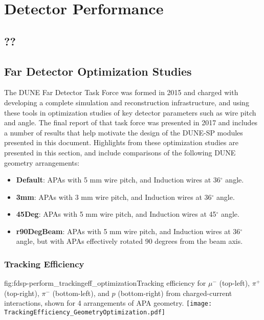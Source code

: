 \chapter{Detector Performance}
\label{ch:fdsp-perform}

\section{??}
\label{sec:fdsp-perform-??}

\section{Far Detector Optimization Studies}
\label{sec:fdsp-perform-optimization}

The DUNE Far Detector Task Force was formed in 2015 and charged with developing a complete simulation and reconstruction infrastructure, and using these tools in optimization studies of key detector parameters such as wire pitch and angle.  The final report of that task force was presented in 2017 and includes a number of results that help motivate the design of the DUNE-SP modules presented in this document.  Highlights from these optimization studies are presented in this section, and include comparisons of the following DUNE geometry arrangements:

\begin{itemize}
\item{\textbf{Default}: APAs with 5 mm wire pitch, and Induction wires at 36$^{\circ}$ angle.}
\item{\textbf{3mm}: APAs with 3 mm wire pitch, and Induction wires at 36$^{\circ}$ angle.}
\item{\textbf{45Deg}: APAs with 5 mm wire pitch, and Induction wires at 45$^{\circ}$ angle.}
\item{\textbf{r90DegBeam}: APAs with 5 mm wire pitch, and Induction wires at 36$^{\circ}$ angle, but with APAs effectively rotated 90 degrees from the beam axis.}  
\end{itemize}



\subsection{Tracking Efficiency}
\label{sec:fdsp-perform-trackingeff}



\begin{dunefigure}{fig:fdsp-perform_trackingeff_optimization}{Tracking efficiency for $\mu^-$ (top-left), $\pi^+$ (top-right), $\pi^-$ (bottom-left), and $p$ (bottom-right) from charged-current interactions, shown for 4 arrangements of APA geometry.}
\texttt{[image: TrackingEfficiency\_GeometryOptimization.pdf]}
\end{dunefigure}

